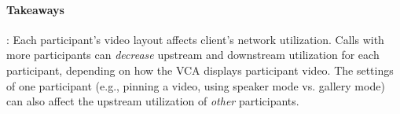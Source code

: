 \begin{mdframed}[roundcorner=5pt, backgroundcolor=black!10]
    \paragraph{Takeaways}: Each participant's video layout affects client's
    network utilization. Calls with more participants can {\em decrease} upstream and downstream utilization 
    for each participant, depending on how the VCA displays participant video.
    The settings of one participant (e.g., pinning a video, using speaker mode
    vs. gallery mode) can also affect the upstream utilization of {\em other}
    participants.
\end{mdframed}

